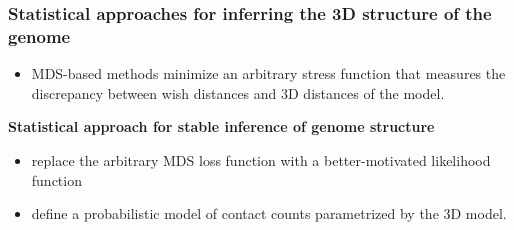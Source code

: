 \documentclass[xcolor=dvipsnames]{beamer}
\begin{document}
\begin{frame}
\frametitle{Statistical approaches for inferring the 3D structure of the
genome}
\begin{itemize}[label={$\bullet$}]

\item MDS-based methods minimize an arbitrary stress function that measures
the discrepancy between wish distances and 3D distances of the model.
\end{itemize}

\vspace{1em}

{\color{Blue} \textbf{Statistical approach for stable inference of genome
structure}} \\
\begin{itemize}[label={$\bullet$}]

\item replace the arbitrary MDS loss function with a better-motivated
likelihood function
\item define a probabilistic model of contact counts parametrized by the 3D
model.
\end{itemize}
\end{frame}



\end{document}
